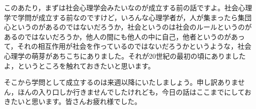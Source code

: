 \documentclass{ltjsbook}
\begin{document}
このあたり，まずは社会心理学会みたいなのが成立する前の話ですよ。社会心理学で学問が成立する前なのですけど，いろんな心理学者が，人が集まったら集団心というのがあるのではないだろうか，社会というのは社会のルールというのがあるのではないだろうか，他人の間にも他人の中に自己，他者というのがあって，それの相互作用が社会を作っているのではないだろうかというような，社会心理学の萌芽があちこちにありました。それが20世紀の最初の頃にありましたよ，というところを触れておきたいと思います。

そこから学問として成立するのは来週以降にいたしましょう。申し訳ありません，ほんの入り口しか行きませんでしたけれども，今日の話はここまでにしておきたいと思います。皆さんお疲れ様でした。


\printbibliography[title=引用文献]
\end{document}
